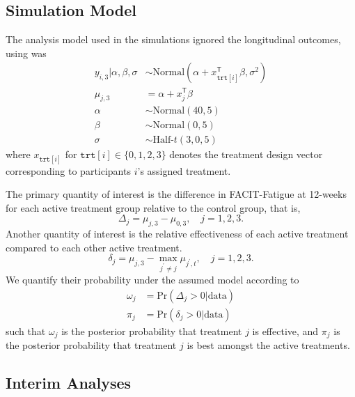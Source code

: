 \documentclass[11pt,parskip=half-]{scrartcl}
\begin{document}
\label{trial-simulations}

\subsection*{Simulation Model}

The analysis model used in the simulations ignored the longitudinal outcomes, using was
$$
  \begin{aligned}
    y_{i,3}|\alpha,\beta,\sigma & \sim \text{Normal}(\alpha + x_{\texttt{trt}[i]}^\mathsf{T}\beta, \sigma^2) \\
    \mu_{j,3}                   & = \alpha + x_j^\mathsf{T}\beta                                             \\
    \alpha                      & \sim \text{Normal}(40, 5)                                                  \\
    \beta                       & \sim \text{Normal}(0, 5)                                                   \\
    \sigma                      & \sim \text{Half-}t(3, 0, 5)
  \end{aligned}
$$
where $x_{\texttt{trt}[i]}$ for $\texttt{trt}[i]\in\{0,1,2,3\}$ denotes the treatment design vector corresponding to participants $i$'s assigned treatment.

The primary quantity of interest is the difference in FACIT-Fatigue at 12-weeks for each active treatment group relative to the control group, that is,
$$
  \Delta_j = \mu_{j,3} - \mu_{0,3},\quad j=1,2,3.
$$
Another quantity of interest is the relative effectiveness of each active treatment compared to each other active treatment.
$$
  \delta_j = \mu_{j,3} - \max_{j^\prime\ne j} \mu_{j^\prime,t},\quad j=1,2,3.
$$
We quantify their probability under the assumed model according to
$$
  \begin{aligned}
    \omega_j & = \text{Pr}(\Delta_j > 0 | \text{data}) \\
    \pi_j    & = \text{Pr}(\delta_j > 0|\text{data})
  \end{aligned}
$$
such that $\omega_j$ is the posterior probability that treatment $j$ is effective, and $\pi_j$ is the posterior probability that treatment $j$ is best amongst the active treatments.

\subsection*{Interim Analyses}
\end{document}
